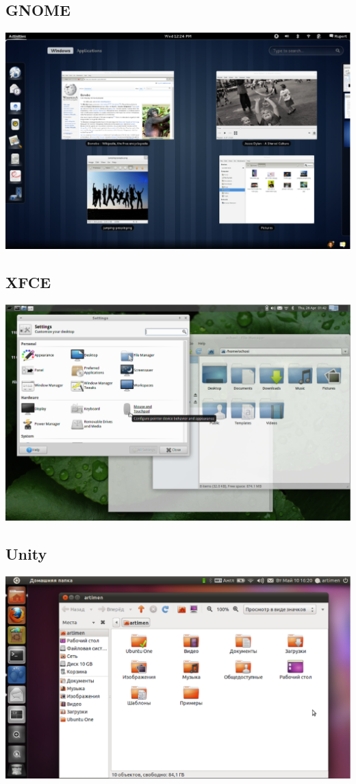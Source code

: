 \subsection{GNOME}
\includegraphics[scale=0.5]{Software/Gnome.eps}
\subsection{XFCE}
\includegraphics[scale=0.28]{Software/XFCE.eps}
\subsection{Unity}
\includegraphics[scale=0.35]{Software/Unity.eps}

